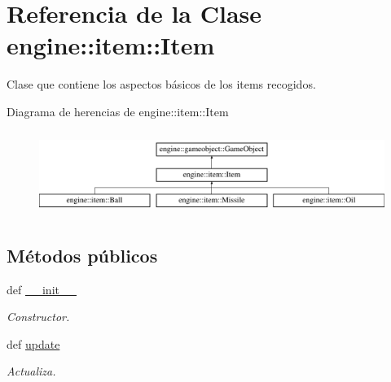 \hypertarget{classengine_1_1item_1_1Item}{
\section{\-Referencia de la \-Clase engine\-:\-:item\-:\-:\-Item}
\label{classengine_1_1item_1_1Item}
}


\-Clase que contiene los aspectos básicos de los items recogidos.  


\-Diagrama de herencias de engine\-:\-:item\-:\-:\-Item\begin{figure}[H]
\begin{center}
\leavevmode
\includegraphics[height=2.758621cm]{classengine_1_1item_1_1Item}
\end{center}
\end{figure}
\subsection*{\-Métodos públicos}
\begin{DoxyCompactItemize}
\item 
def \hyperlink{classengine_1_1item_1_1Item_a9a57155f9ef0d479ae7a917af9f77162}{\-\_\-\-\_\-init\-\_\-\-\_\-}
\begin{DoxyCompactList}\small\item\em \-Constructor. \end{DoxyCompactList}\item 
\hypertarget{classengine_1_1item_1_1Item_aa0c260a0ae3834fbd999268b1aae62da}{
def \hyperlink{classengine_1_1item_1_1Item_aa0c260a0ae3834fbd999268b1aae62da}{update}}
\label{classengine_1_1item_1_1Item_aa0c260a0ae3834fbd999268b1aae62da}

\begin{DoxyCompactList}\small\item\em \-Actualiza. \end{DoxyCompactList}\end{DoxyCompactItemize}
